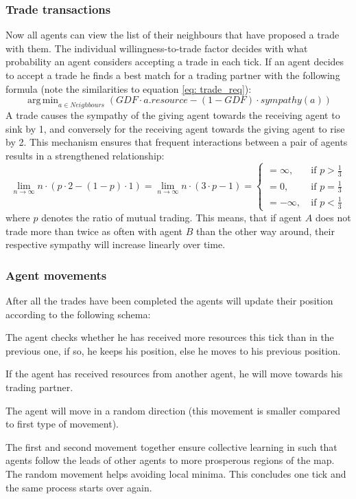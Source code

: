 \documentclass{JASSS}
\DeclareMathOperator*{\argmin}{arg\,min}
\newcommand{\gdf}{\mathit{GDF}}
\begin{document}
	
\subsubsection{Trade transactions}
	 Now all agents can view the list of their neighbours that have proposed a trade with them. The individual willingness-to-trade factor decides with what probability an agent considers accepting a trade in each tick. If an agent decides to accept a trade he finds a best match for a trading partner with the following formula (note the similarities to equation \ref{eq: trade_req}):
	 \begin{equation}
		 \argmin_{a \in \mathit{Neighbours}} \left( \gdf \cdot a.\mathit{resource} - (1-\gdf) \cdot \mathit{sympathy}(a) \right)
	 \end{equation}
	 A trade causes the sympathy of the giving agent towards the receiving agent to sink by 1, and conversely for the receiving agent towards the giving agent to rise by 2. This mechanism ensures that frequent interactions between a pair of agents results in a strengthened relationship:
	 \begin{equation}
	 	\lim_{n \to \infty} n \cdot (p\cdot 2 - (1 - p)\cdot 1) = \lim_{n \to \infty} n \cdot (3\cdot p - 1) = \begin{cases}
	 	= \infty,\quad &\text{if $p > \frac{1}{3}$}\\
	 		= 0, &\text{if $p = \frac{1}{3}$}\\
	 		= -\infty, &\text{if $p < \frac{1}{3}$}
	 	\end{cases}
	 \end{equation}
	 where $p$ denotes the ratio of mutual trading. This means, that if agent $A$ does not trade more than twice as often with agent $B$ than the other way around, their respective sympathy will increase linearly over time.

\subsubsection{Agent movements}
		After all the trades have been completed the agents will update their position according to the following schema:
\begin{enumerate*}
	\item
		The agent checks whether he has received more resources this tick than in the previous one, if so, he keeps his position, else he moves to his previous position.

	\item
		If the agent has received resources from another agent, he will move towards his trading partner.

	\item
		The agent will move in a random direction (this movement is smaller compared to first type of movement). 
\end{enumerate*}
The first and second movement together ensure collective learning in such that agents follow the leads of other agents to more prosperous regions of the map. The random movement helps avoiding local minima. This concludes one tick and the same process starts over again.
\end{document}
